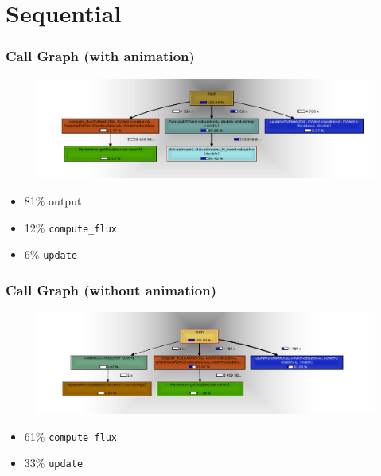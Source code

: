 \documentclass{beamer}
\begin{document}
\section{Sequential}
\begin{frame}
	\frametitle{Call Graph (with animation)}

\begin{figure}
\begin{center}
\includegraphics[width=\textwidth]{images/output.png}
\end{center}
\end{figure}

\begin{center}
\parbox{0.5\textwidth}{
\begin{itemize}
\item{81\% output}
\item{12\% \texttt{compute\_flux}}
\item{6\% \texttt{update}}
\end{itemize}
}
\end{center}
\end{frame}





\begin{frame}
	\frametitle{Call Graph (without animation)}

\begin{figure}
\begin{center}
\includegraphics[width=\textwidth]{images/no_output.png}
\end{center}
\end{figure}

\begin{center}
\parbox{0.5\textwidth}{
\begin{itemize}
\item{61\% \texttt{compute\_flux}}
\item{33\% \texttt{update}}
\end{itemize}
}
\end{center}
\end{frame}
\end{document}
